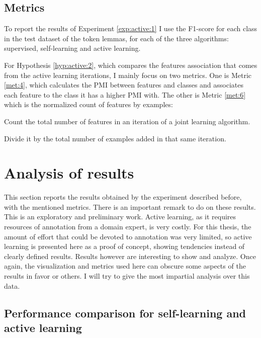 \subsection{Metrics}\label{sec:active:metrics}

To report the results of Experiment \ref{exp:active:1} I use the F1-score for
each class in the test dataset of the token lemmas, for each of the three
algorithms: supervised, self-learning and active learning.

For Hypothesis \ref{hyp:active:2}, which compares the features association that
comes from the active learning iterations, I mainly focus on two metrics. One
is Metric \ref{met:4}, which calculates the PMI between features and classes
and associates each feature to the class it has a higher PMI with. The other is
Metric \ref{met:6} which is the normalized count of features by examples: 

\begin{metric}\label{met:6}
  \begin{enummet}
    \item Count the total number of features in an iteration of a joint
      learning algorithm.
    \item Divide it by the total number of examples added in that same
      iteration.
  \end{enummet}
\end{metric}

\section{Analysis of results}\label{sec:active:results}

This section reports the results obtained by the experiment described before,
with the mentioned metrics. There is an important remark to do on these
results. This is an exploratory and preliminary work. Active learning, as it
requires resources of annotation from a domain expert, is very costly. For this
thesis, the amount of effort that could be devoted to annotation was very
limited, so active learning is presented here as a proof of concept, showing
tendencies instead of clearly defined results. Results however are interesting
to show and analyze. Once again, the visualization and metrics used here can
obscure some aspects of the results in favor or others. I will try to give the
most impartial analysis over this data.

\subsection{Performance comparison for self-learning and active learning}

